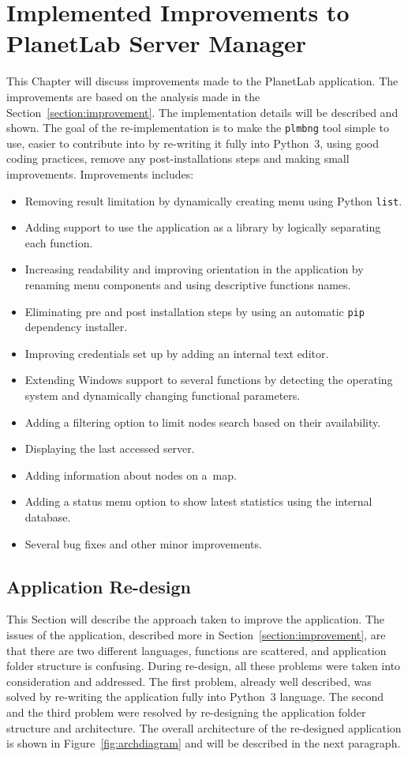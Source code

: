 \chapter{Implemented Improvements to PlanetLab Server Manager}
\label{chapter:improve}
This Chapter will discuss improvements made to the PlanetLab application. The improvements are based on the analysis made in the Section~\ref{section:improvement}. The implementation details will be described and shown. The goal of the re-implementation is to make the \texttt{plmbng} tool simple to use, easier to contribute into by re-writing it fully into Python~3, using good coding practices, remove any post-installations steps and making small improvements. Improvements includes:
\begin{itemize}
	\item Removing result limitation by dynamically creating menu using Python \texttt{list}.
	\item Adding support to use the application as a library by logically separating each function.
	\item Increasing readability and improving orientation in the application by renaming menu components and using descriptive functions names.
	\item Eliminating pre and post installation steps by using an automatic \texttt{pip} dependency installer.
	\item Improving credentials set up by adding an internal text editor.
	\item Extending Windows support to several functions by detecting the operating system and dynamically changing functional parameters.
	\item Adding a filtering option to limit nodes search based on their availability.
	\item Displaying the last accessed server.
	\item Adding information about nodes on a~map.
	\item Adding a status menu option to show latest statistics using the internal database.
	\item Several bug fixes and other minor improvements.
\end{itemize}

\section{Application Re-design}
\label{section:redesign}
This Section will describe the approach taken to improve the application. The issues of the application, described more in Section~\ref{section:improvement}, are that there are two different languages, functions are scattered, and application folder structure is confusing. During re-design, all these problems were taken into consideration and addressed. The first problem, already well described, was solved by re-writing the application fully into Python~3 language. The second and the third problem were resolved by re-designing the application folder structure and architecture. The overall architecture of the re-designed application is shown in Figure~\ref{fig:archdiagram} and will be described in the next paragraph.\\

